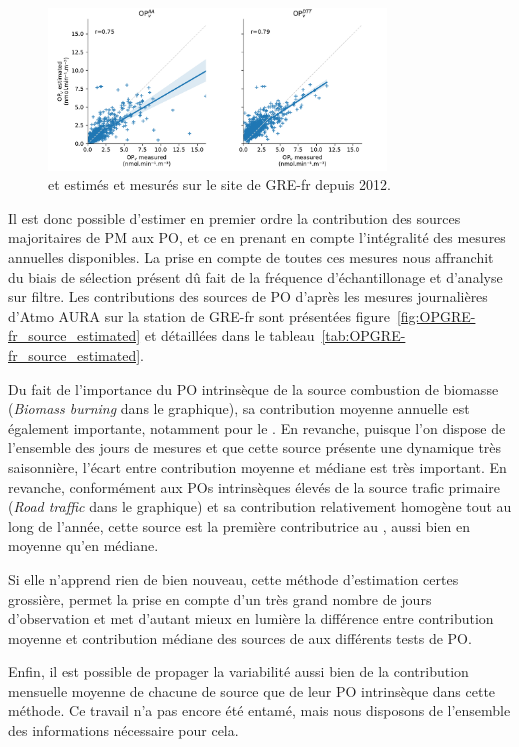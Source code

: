 \begin{figure}[ht]
    \centering
    \includegraphics[width=0.8\textwidth]{figures/chapter05/OPGRE-fr_estimated_scatter.pdf}
    \caption{\POAAv{} et \PODTTv{} estimés et mesurés sur le site de GRE-fr depuis 2012.}
    \label{fig:OPGRE-fr-estimated_scatter}
\end{figure}


Il est donc possible d'estimer en premier ordre la contribution des sources majoritaires de
PM aux PO, et ce en prenant en compte l'intégralité des mesures annuelles disponibles. La
prise en compte de toutes ces mesures nous affranchit du biais de sélection présent dû
fait de la fréquence d'échantillonage et d'analyse sur filtre. Les contributions des
sources de PO d'après les mesures journalières d'Atmo AURA sur la station de GRE-fr sont
présentées figure~\ref{fig:OPGRE-fr_source_estimated} et détaillées dans le
tableau~\ref{tab:OPGRE-fr_source_estimated}.

Du fait de l'importance du PO intrinsèque de la source combustion de biomasse
(\textit{Biomass burning} dans le graphique), sa contribution moyenne annuelle est
également importante, notamment pour le \POAAv.  En revanche, puisque l'on dispose de
l'ensemble des jours de mesures et que cette source présente une dynamique très
saisonnière, l'écart entre contribution moyenne et médiane est très important.
En revanche, conformément aux POs intrinsèques élevés de la source trafic primaire
(\textit{Road traffic} dans le graphique) et sa contribution relativement homogène tout au
long de l'année, cette source est la première contributrice au \PODTTv, aussi bien en
moyenne qu'en médiane.

Si elle n'apprend rien de bien nouveau, cette méthode d'estimation certes grossière,
permet la prise en compte d'un très grand nombre de jours d'observation et met d'autant
mieux en lumière la différence entre contribution moyenne et contribution médiane des
sources de \PMdix{} aux différents tests de PO.

Enfin, il est possible de propager la variabilité aussi bien de la contribution mensuelle
moyenne de chacune de source que de leur PO intrinsèque dans cette méthode. Ce travail n'a
pas encore été entamé, mais nous disposons de l'ensemble des informations nécessaire pour
cela.

